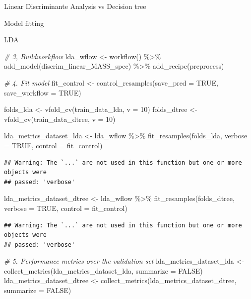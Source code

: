 \documentclass[
  ignorenonframetext,
]{article}
\newenvironment{Shaded}{\begin{snugshade}}{\end{snugshade}}
\newcommand{\AttributeTok}[1]{\textcolor[rgb]{0.77,0.63,0.00}{#1}}
\newcommand{\CommentTok}[1]{\textcolor[rgb]{0.56,0.35,0.01}{\textit{#1}}}
\newcommand{\ConstantTok}[1]{\textcolor[rgb]{0.00,0.00,0.00}{#1}}
\newcommand{\DecValTok}[1]{\textcolor[rgb]{0.00,0.00,0.81}{#1}}
\newcommand{\FunctionTok}[1]{\textcolor[rgb]{0.00,0.00,0.00}{#1}}
\newcommand{\NormalTok}[1]{#1}
\newcommand{\OtherTok}[1]{\textcolor[rgb]{0.56,0.35,0.01}{#1}}
\newcommand{\SpecialCharTok}[1]{\textcolor[rgb]{0.00,0.00,0.00}{#1}}
\begin{document}
\begin{frame}[fragile]{Linear Discriminante Analysis vs Decision tree}
\begin{block}{Model fitting}
\begin{block}{LDA}
\begin{Shaded}
\begin{Highlighting}[]
\CommentTok{\# 3, Buildworkflow}
\NormalTok{lda\_wflow }\OtherTok{\textless{}{-}} 
  \FunctionTok{workflow}\NormalTok{() }\SpecialCharTok{\%\textgreater{}\%} 
  \FunctionTok{add\_model}\NormalTok{(discrim\_linear\_MASS\_spec) }\SpecialCharTok{\%\textgreater{}\%} 
  \FunctionTok{add\_recipe}\NormalTok{(preprocess)}

\CommentTok{\# 4. Fit model}
\NormalTok{fit\_control }\OtherTok{\textless{}{-}} \FunctionTok{control\_resamples}\NormalTok{(}\AttributeTok{save\_pred =} \ConstantTok{TRUE}\NormalTok{, }\AttributeTok{save\_workflow =} \ConstantTok{TRUE}\NormalTok{)}

\NormalTok{folds\_lda }\OtherTok{\textless{}{-}} \FunctionTok{vfold\_cv}\NormalTok{(train\_data\_lda, }\AttributeTok{v =} \DecValTok{10}\NormalTok{)}
\NormalTok{folds\_dtree }\OtherTok{\textless{}{-}} \FunctionTok{vfold\_cv}\NormalTok{(train\_data\_dtree, }\AttributeTok{v =} \DecValTok{10}\NormalTok{)}


\NormalTok{lda\_metrics\_dataset\_lda }\OtherTok{\textless{}{-}} 
\NormalTok{  lda\_wflow }\SpecialCharTok{\%\textgreater{}\%} 
  \FunctionTok{fit\_resamples}\NormalTok{(folds\_lda, }\AttributeTok{verbose =} \ConstantTok{TRUE}\NormalTok{, }\AttributeTok{control =}\NormalTok{ fit\_control)}
\end{Highlighting}
\end{Shaded}

\begin{verbatim}
## Warning: The `...` are not used in this function but one or more objects were
## passed: 'verbose'
\end{verbatim}

\begin{Shaded}
\begin{Highlighting}[]
\NormalTok{lda\_metrics\_dataset\_dtree }\OtherTok{\textless{}{-}} 
\NormalTok{  lda\_wflow }\SpecialCharTok{\%\textgreater{}\%} 
  \FunctionTok{fit\_resamples}\NormalTok{(folds\_dtree, }\AttributeTok{verbose =} \ConstantTok{TRUE}\NormalTok{, }\AttributeTok{control =}\NormalTok{ fit\_control)}
\end{Highlighting}
\end{Shaded}

\begin{verbatim}
## Warning: The `...` are not used in this function but one or more objects were
## passed: 'verbose'
\end{verbatim}

\begin{Shaded}
\begin{Highlighting}[]
\CommentTok{\# 5. Performance metrics over the validation set}
\NormalTok{lda\_metrics\_dataset\_lda }\OtherTok{\textless{}{-}} \FunctionTok{collect\_metrics}\NormalTok{(lda\_metrics\_dataset\_lda, }\AttributeTok{summarize =} \ConstantTok{FALSE}\NormalTok{)}
\NormalTok{lda\_metrics\_dataset\_dtree }\OtherTok{\textless{}{-}} \FunctionTok{collect\_metrics}\NormalTok{(lda\_metrics\_dataset\_dtree, }\AttributeTok{summarize =} \ConstantTok{FALSE}\NormalTok{)}



\end{Highlighting}
\end{Shaded}
\end{block}
\end{block}
\end{frame}
\end{document}
